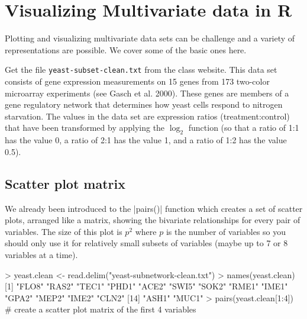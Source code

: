 
\section{Visualizing Multivariate data in R}

Plotting and visualizing multivariate data sets can be challenge and a
variety of representations are possible. We cover some of the basic ones
here. 

Get the file \lstinline!yeast-subset-clean.txt! from the class
website. This data set consists of gene expression measurements
on 15 genes from 173 two-color microarray experiments (see Gasch et al.
2000). These genes are members of a gene regulatory network that determines how yeast cells
respond to nitrogen starvation. The values in the data set are
expression ratios (treatment:control) that have been transformed by
applying the $\log_2$ function (so that a ratio of 1:1 has the value 0,
a ratio of 2:1 has the value 1, and a ratio of 1:2 has the value 0.5).  

\subsection{Scatter plot matrix}

We already been introduced to the |pairs()| function which creates a set of scatter plots, arranged like
a matrix, showing the bivariate relationships for every pair of
variables. The size of this plot is $p^2$ where $p$ is the number of
variables so you should only use it for relatively small subsets of
variables (maybe up to 7 or 8 variables at a time).

\begin{R}
> yeast.clean <- read.delim("yeast-subnetwork-clean.txt")
> names(yeast.clean)
 [1] "FLO8" "RAS2" "TEC1" "PHD1" "ACE2" "SWI5" "SOK2" "RME1" "IME1" "GPA2" "MEP2" "IME2" "CLN2"
[14] "ASH1" "MUC1"
> pairs(yeast.clean[1:4]) # create a scatter plot matrix of the first 4 variables
\end{R}

